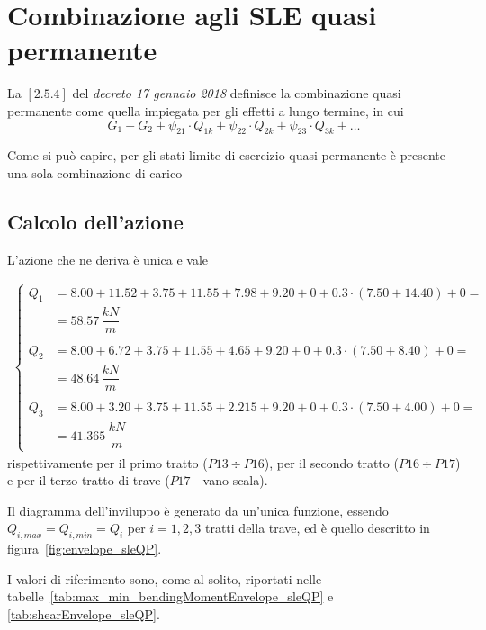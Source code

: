 \section{Combinazione agli SLE quasi permanente}
La $[2.5.4]$ del \emph{decreto 17 gennaio 2018} definisce la combinazione quasi permanente come quella impiegata per gli effetti a lungo termine, in cui
\[
	G_1 + G_2 + \psi_{21}\cdot Q_{1k} + \psi_{22}\cdot Q_{2k} + \psi_{23}\cdot Q_{3k} + \dots
\]

Come si può capire, per gli stati limite di esercizio quasi permanente è presente una sola combinazione di carico

\subsection{Calcolo dell'azione}
L'azione che ne deriva è unica e vale

\begin{align*}
	\begin{cases}
		 Q_{1} &= 8.00+11.52+3.75 + 11.55+7.98+9.20 + 0 + 0.3\cdot(7.50+14.40) + 0 =\\&= 58.57\,\dfrac{kN}{m}\\\\
		 Q_2 &= 8.00+6.72+3.75 + 11.55+4.65+9.20 + 0+ 0.3\cdot(7.50+8.40) + 0 =\\&= 48.64\,\dfrac{kN}{m}\\\\
		 Q_3 &=  8.00+3.20+3.75 + 11.55+2.215+9.20 + 0+ 0.3\cdot(7.50+4.00) + 0 =\\&= 41.365\,\dfrac{kN}{m}
	\end{cases}
\end{align*}
rispettivamente per il primo tratto ($P13\div P16$), per il secondo tratto ($P16\div P17$) e per il terzo tratto di trave ($P17$ - vano scala).

Il diagramma dell'inviluppo è generato da un'unica funzione, essendo $Q_{i,max} = Q_{i,min} = Q_i$ per $i=1,2,3$ tratti della trave, ed è quello descritto in figura~\ref{fig:envelope_sleQP}.

I valori di riferimento sono, come al solito, riportati nelle tabelle~\ref{tab:max_min_bendingMomentEnvelope_sleQP} e \ref{tab:shearEnvelope_sleQP}.

